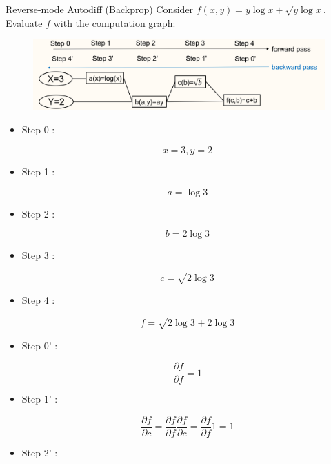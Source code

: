 \begin{frame}[allowframebreaks]

\begin{myexampleblock}{6.43}{Reverse-mode Autodiff (Backprop)}
    Consider $f(x, y)=y \log x+\sqrt{y \log x}$. Evaluate $f$ with the computation graph:

    \begin{figure}[H]
        \centering
        \includegraphics[width=1.0\textwidth]{.././assets/6.12.png}
    \end{figure}

    \begin{itemize}
        \item
        Step 0 :

        $$
        x=3, y=2
        $$
        \item
        Step 1 :

        $$
        a=\log 3
        $$
        \item
        Step 2 :

        $$
        b=2 \log 3
        $$
        \item
        Step 3 :

        $$
        c=\sqrt{2 \log 3}
        $$
        \item
        Step 4 :

        $$
        f=\sqrt{2 \log 3}+2 \log 3
        $$
    \end{itemize}

    \par\noindent\textcolor{gray}{\hdashrule{\textwidth}{0.4pt}{1pt 2pt}}

    \begin{itemize}
        \item
        Step 0' :

        $$
        \frac{\partial f}{\partial f}=1
        $$
        \item
        Step 1' :

        $$
        \frac{\partial f}{\partial c}=\frac{\partial f}{\partial f} \frac{\partial f}{\partial c}=\frac{\partial f}{\partial f} 1=1
        $$
        \item
        Step 2' :


\end{itemize}
\end{myexampleblock}
\end{frame}
